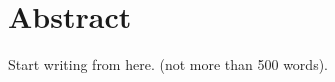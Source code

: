 \doublespacing
\chapter*{Abstract}
\thispagestyle{empty}

Start writing from here.
(not more than 500 words).
